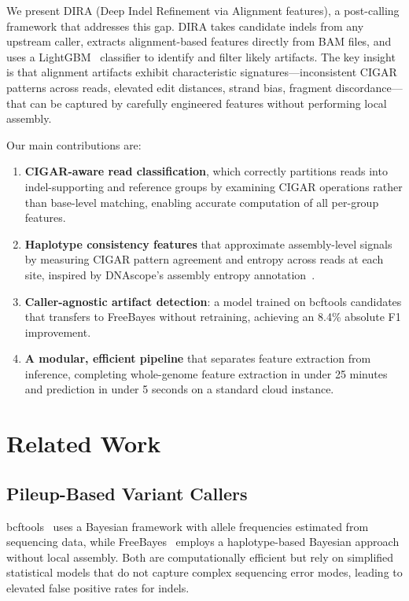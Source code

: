 \documentclass[sigconf]{acmart}
\begin{document}
We present DIRA (Deep Indel Refinement via Alignment features), a post-calling framework that addresses this gap. DIRA takes candidate indels from any upstream caller, extracts alignment-based features directly from BAM files, and uses a LightGBM~\cite{ke2017lightgbm} classifier to identify and filter likely artifacts. The key insight is that alignment artifacts exhibit characteristic signatures---inconsistent CIGAR patterns across reads, elevated edit distances, strand bias, fragment discordance---that can be captured by carefully engineered features without performing local assembly.

Our main contributions are:
\begin{enumerate}
    \item \textbf{CIGAR-aware read classification}, which correctly partitions reads into indel-supporting and reference groups by examining CIGAR operations rather than base-level matching, enabling accurate computation of all per-group features.
    \item \textbf{Haplotype consistency features} that approximate assembly-level signals by measuring CIGAR pattern agreement and entropy across reads at each site, inspired by DNAscope's assembly entropy annotation~\cite{freed2022dnascope}.
    \item \textbf{Caller-agnostic artifact detection}: a model trained on bcftools candidates that transfers to FreeBayes without retraining, achieving an 8.4\% absolute F1 improvement.
    \item \textbf{A modular, efficient pipeline} that separates feature extraction from inference, completing whole-genome feature extraction in under 25 minutes and prediction in under 5 seconds on a standard cloud instance.
\end{enumerate}

\section{Related Work}

\subsection{Pileup-Based Variant Callers}
bcftools~\cite{li2011statistical} uses a Bayesian framework with allele frequencies estimated from sequencing data, while FreeBayes~\cite{garrison2012haplotype} employs a haplotype-based Bayesian approach without local assembly. Both are computationally efficient but rely on simplified statistical models that do not capture complex sequencing error modes, leading to elevated false positive rates for indels.
\end{document}
